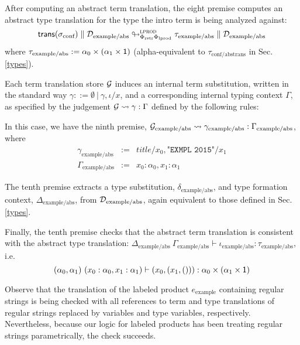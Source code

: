 \documentclass{llncs}
\begin{document}
After computing an abstract term translation, the eight premise computes an abstract type translation for the type the intro term is being analyzed against:
\[\small\tdeabs{\Phi_\text{rstr}\Phi_\text{lprod}}{\tcvar{lprod}}{\srep{\stx{conf}}}{\memD_\text{example/abs}}{\tau_\text{example/abs}}{\memD_\text{example/abs}}\]
where $\tau_\text{example/abs} := \alpha_0 \times (\alpha_1 \times \kunit)$ (alpha-equivalent to $\tau_\text{conf/abstrans}$ in Sec. \ref{types}).

Each term translation store $\memG$ induces an internal term substitution, written in the standard way $\gamma ::= \emptyset ~|~ \gamma, \iota/x$, and a corresponding internal typing context $\Gamma$, as specified by the judgement $\memG \leadsto \gamma : \Gamma$ defined by the following rules:
\begin{mathpar}

\end{mathpar}
In this case, we have the ninth premise, $\memG_\text{example/abs} \leadsto \gamma_\text{example/abs} : \Gamma_\text{example/abs}$, where \[
\begin{array}{lcl}
\gamma_\text{example/abs} & := & title/x_0, \texttt{"EXMPL 2015"}/x_1\\
\Gamma_\text{example/abs} & := & x_0 : \alpha_0, x_1 : \alpha_1
\end{array}
\]

The tenth premise extracts a type substitution, $\delta_\text{example/abs}$, and type formation context, $\Delta_\text{example/abs}$, from $\memD_\text{example/abs}$, again equivalent to those defined in Sec. \ref{types}.

Finally, the tenth premise checks that the abstract term translation is consistent with the abstract type translation: $\Delta_\text{example/abs}~\Gamma_\text{example/abs} \vdash \iota_\text{example/abs} : \tau_\text{example/abs}$, i.e. \[
(\alpha_0, \alpha_1)~(x_0 : \alpha_0, x_1 : \alpha_1) \vdash (x_0, (x_1, ())) : \alpha_0 \times (\alpha_1 \times \kunit)
\]

Observe that the translation of the labeled product $e_\text{example}$ containing regular strings is being checked with all references to term and type translations of regular strings replaced by variables and type variables, respectively. Nevertheless, because our logic for labeled products has been treating regular strings parametrically, the check succeeds.
\end{document}
